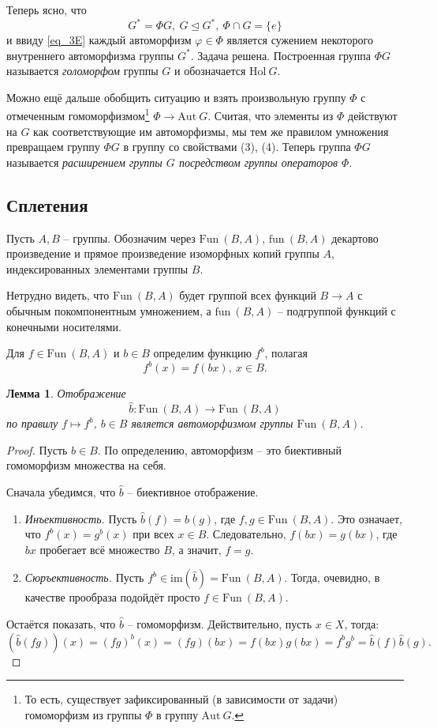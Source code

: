 \documentclass{article}
\newtheorem{lemma}{Лемма}[section]
\begin{document}
Теперь ясно, что $$G^* = \Phi G,\  G \trianglelefteq G^*, \ \Phi \cap G = \{e \} $$ и ввиду \eqref{eq_3E} каждый автоморфизм $\varphi \in \Phi$ является сужением некоторого внутреннего автоморфизма группы $G^*$. Задача решена. Построенная группа $\Phi G$ называется \textit{голоморфом} группы $G$ и обозначается $\mathrm{Hol} \ G$.

Можно ещё дальше обобщить ситуацию и взять произвольную группу $\Phi$ с отмеченным гомоморфизмом\footnote{То есть, существует зафиксированный (в зависимости от задачи) гомоморфизм из группы $\Phi$ в группу $\mathrm{Aut} \ G$.} $\Phi \rightarrow \mathrm{Aut} \ G$. Считая, что элементы из $\Phi$ действуют на $G$ как соответствующие им автоморфизмы, мы тем же правилом умножения превращаем группу $\Phi G$ в группу со свойствами (3), (4). Теперь группа $\Phi G$ называется \textit{расширением группы $G$ посредством группы операторов $\Phi$}.

\subsection{Сплетения}

Пусть $A, B$ -- группы. Обозначим через $\mathrm{Fun} \ (B, A)$, $\mathrm{fun} \ (B, A)$ декартово произведение и прямое произведение изоморфных копий группы $A$, индексированных элементами группы $B$. 

Нетрудно видеть, что $\mathrm{Fun} \ (B, A)$ будет группой всех функций $B \rightarrow A$ с обычным покомпонентным умножением, а $\mathrm{fun} \ (B, A)$ -- подгруппой функций с конечными носителями.

Для $f \in \mathrm{Fun} \ (B, A)$ и $b \in B$ определим функцию $f^b$, полагая $$ f^b(x) = f(bx), \ x \in B. $$
\begin{lemma}
    Отображение $$ \hat{b} : \mathrm{Fun} \ (B, A) \rightarrow \mathrm{Fun} \ (B, A) $$ по правилу $f \mapsto f^b$, $b \in B$ является автоморфизмом группы $\mathrm{Fun} \ (B, A)$.
\end{lemma}
\begin{proof}
    Пусть $b \in B$. По определению, автоморфизм -- это биективный гомоморфизм множества на себя.
    
    Сначала убедимся, что $\hat{b}$ -- биективное отображение.
    \begin{enumerate}
        \item \textit{Инъективность.} Пусть $\hat{b}(f) = \hat{b}(g)$, где $f,g \in \mathrm{Fun} \ (B, A)$. Это означает, что $f^b(x) = g^b(x)$ при всех $x \in B$. Следовательно, $ f(bx) = g(bx) $, где $bx$ пробегает всё множество $B$, а значит, $f = g$.
        \item \textit{Сюръективность.} Пусть $f^b \in \mathrm{im}(\hat{b}) = \mathrm{Fun} \ (B, A) $. Тогда, очевидно, в качестве прообраза подойдёт просто $f \in \mathrm{Fun} \ (B, A) $.
    \end{enumerate}

    Остаётся показать, что $\hat{b}$ -- гомоморфизм. Действительно, пусть $x \in X$, тогда: $$ (\hat{b}(fg))(x) = (fg)^b(x) = (fg)(bx) = f(bx) g(bx) = f^b g^b = \hat{b}(f) \hat{b}(g). $$
\end{proof}
\end{document}

